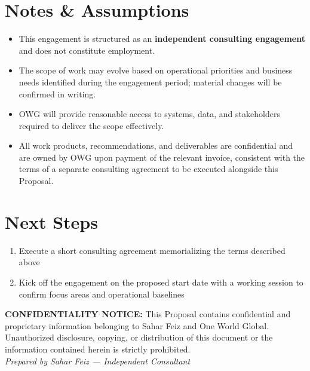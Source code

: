 \documentclass{proposal}
\begin{document}
\section{Notes \& Assumptions}

\begin{itemize}[leftmargin=1.5em, itemsep=4pt, topsep=4pt]
  \item This engagement is structured as an \textbf{independent consulting
        engagement} and does not constitute employment.
  \item The scope of work may evolve based on operational priorities and
        business needs identified during the engagement period; material
        changes will be confirmed in writing.
  \item OWG will provide reasonable access to systems, data, and
        stakeholders required to deliver the scope effectively.
  \item All work products, recommendations, and deliverables are
        confidential and are owned by OWG upon payment of the relevant
        invoice, consistent with the terms of a separate consulting
        agreement to be executed alongside this Proposal.
\end{itemize}

\section{Next Steps}

\begin{enumerate}[leftmargin=1.5em, itemsep=4pt, topsep=4pt]
  \item Execute a short consulting agreement memorializing the terms
        described above
  \item Kick off the engagement on the proposed start date with a working
        session to confirm focus areas and operational baselines
\end{enumerate}

\vspace{28pt}

\begin{mdframed}[
  linecolor=TPBorder,
  linewidth=1pt,
  roundcorner=4pt,
  backgroundcolor=TPLight,
  innerleftmargin=14pt,
  innerrightmargin=14pt,
  innertopmargin=10pt,
  innerbottommargin=10pt
]
\sffamily\footnotesize\color{TPGray}
\textbf{CONFIDENTIALITY NOTICE:} This Proposal contains confidential and
proprietary information belonging to Sahar Feiz and One World Global.
Unauthorized disclosure, copying, or distribution of this document or the
information contained herein is strictly prohibited.\\[4pt]
\textit{Prepared by Sahar Feiz --- Independent Consultant}
\end{mdframed}
\end{document}
